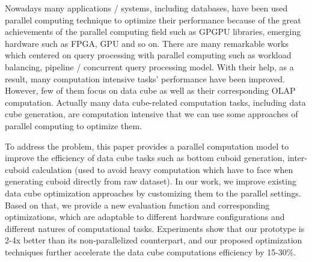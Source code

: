 \begin{enabstract}
Nowadays many applications / systems, including databases, have been used parallel computing technique to optimize their performance because of the great achievements of the parallel computing field such as GPGPU libraries, emerging hardware such as FPGA, GPU and so on. There are many remarkable works which centered on query processing with parallel computing such as workload balancing, pipeline / concurrent query processing model. With their help, as a result, many computation intensive tasks' performance have been improved. However, few of them focus on data cube as well as their corresponding OLAP computation. Actually many data cube-related computation tasks, including data cube generation, are computation intensive that we can use some approaches of parallel computing to optimize them.

To address the problem, this paper provides a parallel computation model to improve the efficiency of data cube tasks such as bottom cuboid generation, inter-cuboid calculation (used to avoid heavy computation which have to face when generating cuboid directly from raw dataset). In our work, we improve existing data cube optimization approaches by customizing them to the parallel settings. Based on that, we provide a new evaluation function and corresponding optimizations, which are adaptable to different hardware configurations and different natures of computational tasks. Experiments show that our prototype is 2-4x better than its non-parallelized counterpart, and our proposed optimization techniques further accelerate the data cube computations efficiency by 15-30\%.

\end{enabstract}
